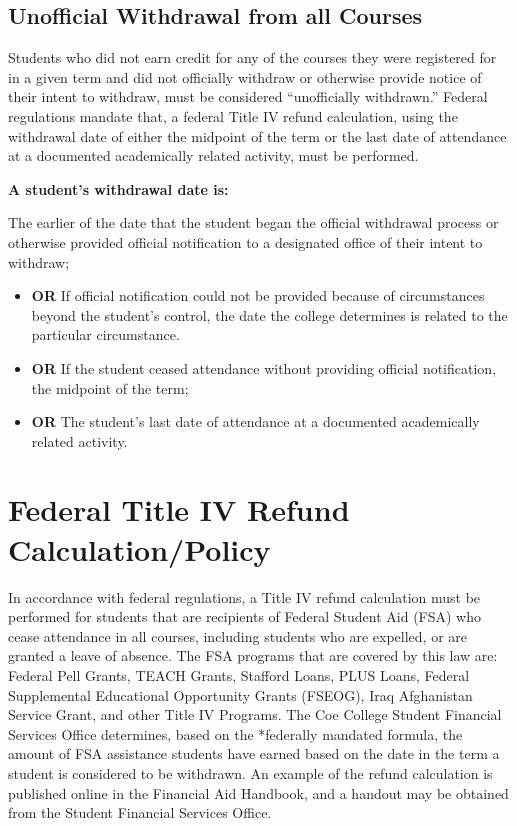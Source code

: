 \documentclass[
  letterpaper,
]{scrbook}
\providecommand{\tightlist}{%
  \setlength{\itemsep}{0pt}\setlength{\parskip}{0pt}}
\begin{document}
\subsection{Unofficial Withdrawal from all
Courses}\label{unofficial-withdrawal-from-all-courses}

Students who did not earn credit for any of the courses they were
registered for in a given term and did not officially withdraw or
otherwise provide notice of their intent to withdraw, must be considered
``unofficially withdrawn.'' Federal regulations mandate that, a federal
Title IV refund calculation, using the withdrawal date of either the
midpoint of the term or the last date of attendance at a documented
academically related activity, must be performed.

\textbf{A student's withdrawal date is:}

The earlier of the date that the student began the official withdrawal
process or otherwise provided official notification to a designated
office of their intent to withdraw;

\begin{itemize}
\tightlist
\item
  \textbf{OR} If official notification could not be provided because of
  circumstances beyond the student's control, the date the college
  determines is related to the particular circumstance.\\
\item
  \textbf{OR} If the student ceased attendance without providing
  official notification, the midpoint of the term;\\
\item
  \textbf{OR} The student's last date of attendance at a documented
  academically related activity.
\end{itemize}

\section{Federal Title IV Refund
Calculation/Policy}\label{sec-federal-title-IV-refund-calculation-policy}

In accordance with federal regulations, a Title IV refund calculation
must be performed for students that are recipients of Federal Student
Aid (FSA) who cease attendance in all courses, including students who
are expelled, or are granted a leave of absence. The FSA programs that
are covered by this law are: Federal Pell Grants, TEACH Grants, Stafford
Loans, PLUS Loans, Federal Supplemental Educational Opportunity Grants
(FSEOG), Iraq Afghanistan Service Grant, and other Title IV Programs.
The Coe College Student Financial Services Office determines, based on
the *federally mandated formula, the amount of FSA assistance students
have earned based on the date in the term a student is considered to be
withdrawn. An example of the refund calculation is published online in
the Financial Aid Handbook, and a handout may be obtained from the
Student Financial Services Office.
\end{document}
